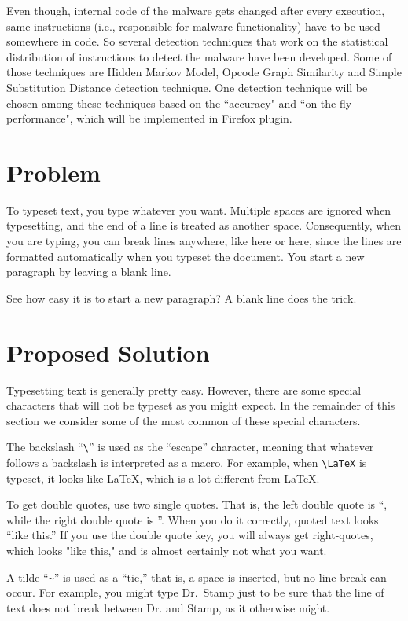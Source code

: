 Even though, internal code of the malware gets changed after every execution, same instructions (i.e., responsible for malware functionality) have to be used somewhere in code. So several detection techniques that work on the statistical distribution of instructions to detect the malware have been developed. Some of those techniques are Hidden Markov Model, Opcode Graph Similarity and Simple Substitution Distance detection technique. One detection technique will be chosen among these techniques based on the “accuracy" and “on the fly performance", which will be implemented in Firefox plugin. 

\section{Problem} 

To typeset text, you type whatever you want. Multiple spaces are
ignored                           when typesetting, and
the end of a line is treated as another space.
Consequently, when you are typing, you can break lines anywhere, like here
or here,
since the lines are formatted automatically when you typeset the document.
You start a new paragraph by leaving a blank line.

See how easy it is to start a new paragraph? A blank line does the trick.


\section{Proposed Solution}

Typesetting text is generally pretty easy. However, there are some special
characters that will not be typeset as you might expect. In the remainder of this
section we consider some of the most common of these
special characters. 

The backslash ``\verb+\+'' is used 
as the ``escape'' character, meaning that
whatever follows a backslash is interpreted as a macro.
For example, when \verb+\LaTeX+ is typeset, it looks like \LaTeX, which 
is a lot different from LaTeX.

To get double quotes, use two single quotes. That is, the left double quote is ``, while the right double
quote is ''. When you do it correctly, quoted text looks ``like this.''
If you use the double quote key, you will always get right-quotes, which looks "like this," and is
almost certainly not what you want.

A tilde ``\verb+~+'' is used as a ``tie,'' that is, a space is inserted, but no line break can occur.
For example, you might type Dr.~Stamp just to be sure that the line of text
does not break between Dr. and Stamp, as it otherwise might.

